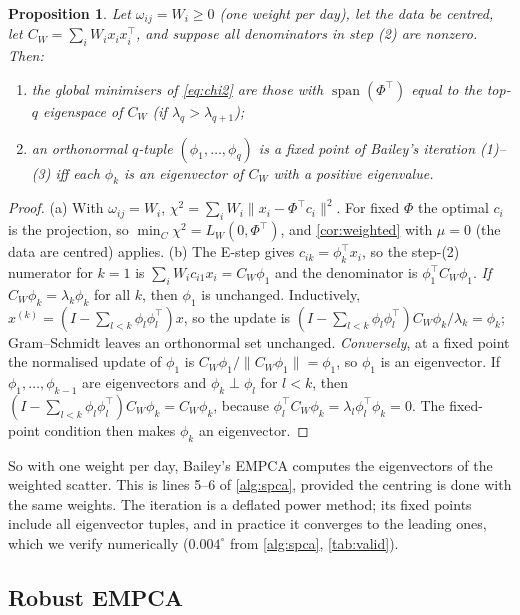 \documentclass[11pt]{article}
\newtheorem{proposition}[theorem]{Proposition}
\theoremstyle{definition}
\theoremstyle{remark}
\DeclareMathOperator{\spn}{span}
\newcommand{\norm}[1]{\lVert #1\rVert}
\begin{document}
\begin{proposition}\label{prop:bailey}
Let $\omega_{ij}=W_i\ge0$ (one weight per day), let the data be centred, let $C_W=\sum_iW_ix_ix_i^\top$, and suppose all
denominators in step (2) are nonzero. Then:
\begin{enumerate}[label=(\alph*)]
\item the global minimisers of \eqref{eq:chi2} are those with $\spn(\Phi^\top)$ equal to the top-$q$ eigenspace of $C_W$
(if $\lambda_q>\lambda_{q+1}$);
\item an orthonormal $q$-tuple $(\phi_1,\dots,\phi_q)$ is a fixed point of Bailey's iteration (1)--(3) iff each $\phi_k$ is an
eigenvector of $C_W$ with a positive eigenvalue.
\end{enumerate}
\end{proposition}
\begin{proof}
(a) With $\omega_{ij}=W_i$, $\chi^2=\sum_iW_i\norm{x_i-\Phi^\top c_i}^2$. For fixed $\Phi$ the optimal $c_i$ is the projection,
so $\min_C\chi^2=L_W(0,\Phi^\top)$, and \cref{cor:weighted} with $\mu=0$ (the data are centred) applies.
(b) The E-step gives $c_{ik}=\phi_k^\top x_i$, so the step-(2) numerator for $k=1$ is
$\sum_iW_ic_{i1}x_i=C_W\phi_1$ and the denominator is $\phi_1^\top C_W\phi_1$.
\emph{If} $C_W\phi_k=\lambda_k\phi_k$ for all $k$, then $\phi_1$ is unchanged. Inductively,
$x^{(k)}=(I-\sum_{l<k}\phi_l\phi_l^\top)x$, so the update is
$(I-\sum_{l<k}\phi_l\phi_l^\top)C_W\phi_k/\lambda_k=\phi_k$; Gram--Schmidt leaves an orthonormal set unchanged.
\emph{Conversely}, at a fixed point the normalised update of $\phi_1$ is $C_W\phi_1/\norm{C_W\phi_1}=\phi_1$, so $\phi_1$ is an
eigenvector. If $\phi_1,\dots,\phi_{k-1}$ are eigenvectors and $\phi_k\perp\phi_l$ for $l<k$, then
$(I-\sum_{l<k}\phi_l\phi_l^\top)C_W\phi_k=C_W\phi_k$, because $\phi_l^\top C_W\phi_k=\lambda_l\phi_l^\top\phi_k=0$. The fixed-point
condition then makes $\phi_k$ an eigenvector.
\end{proof}

So with one weight per day, Bailey's EMPCA computes the eigenvectors of the weighted scatter. This is lines 5--6 of
\cref{alg:spca}, provided the centring is done with the same weights. The iteration is a deflated power method;
its fixed points include all eigenvector tuples, and in practice it converges to the leading ones, which we verify
numerically ($0.004^\circ$ from \cref{alg:spca}, \cref{tab:valid}).

\subsection{Robust EMPCA}
\end{document}
